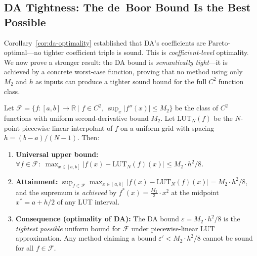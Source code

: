 \subsection{DA Tightness: The de~Boor Bound Is the Best Possible}
\label{sec:tightness}

Corollary~\ref{cor:da-optimality} established that DA's coefficients are
Pareto-optimal---no tighter coefficient triple is sound. This is
\textit{coefficient-level} optimality. We now prove a stronger result:
the DA bound is \textit{semantically tight}---it is achieved by a
concrete worst-case function, proving that no method using only $M_2$
and $h$ as inputs can produce a tighter sound bound for the full $C^2$
function class.

\vspace{4pt}
\begin{kingthm}
\label{thm:tightness}
Let $\mathcal{F} = \{f: [a,b] \to \mathbb{R} \mid f \in C^2,\;
\sup_x |f''(x)| \leq M_2\}$ be the class of $C^2$ functions with
uniform second-derivative bound $M_2$. Let $\text{LUT}_N(f)$ be
the $N$-point piecewise-linear interpolant of $f$ on a uniform grid
with spacing $h = (b-a)/(N-1)$. Then:

\begin{enumerate}[label=(\roman*)]
    \item \textbf{Universal upper bound:}
    $\forall f \in \mathcal{F}:\; \max_{x \in [a,b]}
    |f(x) - \text{LUT}_N(f)(x)| \leq M_2 \cdot h^2 / 8$.

    \item \textbf{Attainment:}
    $\sup_{f \in \mathcal{F}} \max_{x \in [a,b]}
    |f(x) - \text{LUT}_N(f)(x)| = M_2 \cdot h^2 / 8$,
    and the supremum is \textit{achieved} by
    $f^*(x) = \frac{M_2}{2} \cdot x^2$ at the midpoint
    $x^* = a + h/2$ of any LUT interval.

    \item \textbf{Consequence (optimality of DA):}
    The DA bound $\varepsilon = M_2 \cdot h^2 / 8$ is the
    \textit{tightest possible} uniform bound for $\mathcal{F}$
    under piecewise-linear LUT approximation. Any method claiming
    a bound $\varepsilon' < M_2 \cdot h^2 / 8$ cannot be sound
    for all $f \in \mathcal{F}$.
\end{enumerate}
\end{kingthm}

